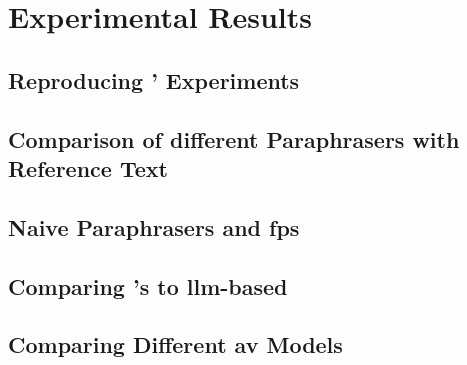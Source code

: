 \chapter{Experimental Results}
\label{chap:experimental_results}

\section{Reproducing \citet{koppel_determining_2014}' Experiments}



\section{Comparison of different Paraphrasers with Reference Text}



\section{Naive Paraphrasers and \acp{fp}}

\section{Comparing \citet{koppel_determining_2014}'s to \ac{llm}-based \imps{}}

\section{Comparing Different \ac{av} Models}